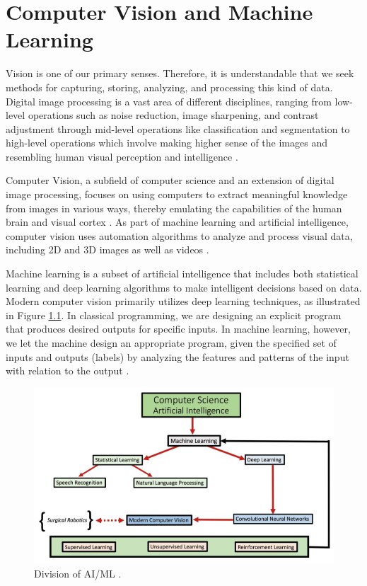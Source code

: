 \chapter{Computer Vision and Machine Learning}
Vision is one of our primary senses. Therefore, it is understandable that we seek methods for capturing, storing, analyzing, and processing this kind of data. Digital image processing is a vast area of different disciplines, ranging from low-level operations such as noise reduction, image sharpening, and contrast adjustment through mid-level operations like classification and segmentation to high-level operations which involve making higher sense of the images and resembling human visual perception and intelligence \cite{Gonzalez2018}. 

Computer Vision, a subfield of computer science and an extension of digital image processing, focuses on using computers to extract meaningful knowledge from images in various ways, thereby emulating the capabilities of the human brain and visual cortex \cite{Gonzalez2018}. As part of machine learning and artificial intelligence, computer vision uses automation algorithms to analyze and process visual data, including 2D and 3D images as well as videos \cite{Szeliski2022, Atallah2020}.

Machine learning is a subset of artificial intelligence that includes both statistical learning and deep learning algorithms to make intelligent decisions based on data. Modern computer vision primarily utilizes deep learning techniques, as illustrated in Figure \ref{fig:ai-ml}. In classical programming, we are designing an explicit program that produces desired outputs for specific inputs. In machine learning, however, we let the machine design an appropriate program, given the specified set of inputs and outputs (labels) by analyzing the features and patterns of the input with relation to the output \cite{Alam2021}.

\begin{figure}[H]
\begin{centering}
\includegraphics[width=12cm]{assets/images/aiml.png}
\par\end{centering}
\caption{Division of AI/ML \cite{Atallah2020}.}
\label{fig:ai-ml}
\end{figure}

